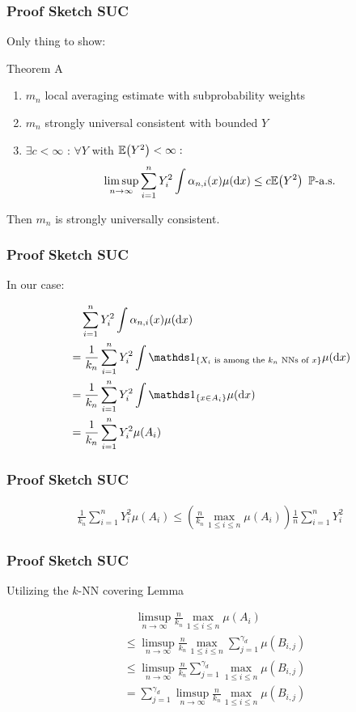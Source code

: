 \begin{frame}
\frametitle{Proof Sketch SUC}
Only thing to show:
\begin{block} {Theorem A}
\begin{enumerate} [label=(\roman*)]
    \item $m_n$ local averaging estimate with subprobability weights
    \item $m_n$ strongly universal consistent with bounded $Y$
    \item $\exists c < \infty $ : $\forall Y$ with $\mathbb{E}\!\left(Y^2\right)<\infty : $
\[\limsup_{n \to \infty} \sum_{i=1}^{n}Y_i^2 \int \alpha_{n,i}(x) \mu(\diff{x}) \leq c\ev{Y^2} \ \text{\(\mathbb{P}\)-a.s.}\]
\end{enumerate}
Then $m_n$ is strongly universally consistent.
\end{block}
\end{frame}

\begin{frame}
\frametitle{Proof Sketch SUC}
In our case:
\begin{block} {}
\begin{align*}
    &\quad \sum_{i=1}^{n}Y_i^2 \int \alpha_{n,i}(x) \mu(\diff{x}) \\
    &= \frac{1}{k_n} \sum_{i=1}^{n}Y_i^2 \int \ind{\{\text{\(X_i\) is among the \(k_n\) NNs of \(x\)}\}} \mu(\diff{x}) \\
    &= \frac{1}{k_n} \sum_{i=1}^{n}Y_i^2 \int \ind{\{x \in A_i\}} \mu(\diff{x}) \\
    &= \frac{1}{k_n} \sum_{i=1}^{n}Y_i^2 \mu(A_i) \\
\end{align*}
\end{block}
\end{frame}

\begin{frame}
\frametitle{Proof Sketch SUC}
\begin{block} {}
\begin{align*}
    \frac{1}{k_n} \sum_{i=1}^{n}Y_i^2 \mu(A_i)
    \leq \left(\frac{n}{k_n} \max_{1 \leq i \leq n} \mu(A_i) \right) \frac{1}{n}\sum_{i=1}^{n}Y_i^2
\end{align*}
\end{block}
\end{frame}

\begin{frame}
\frametitle{Proof Sketch SUC}
Utilizing the \(k\)-NN covering Lemma
\begin{block} {}
\begin{align*}
        &\quad \limsup_{n \to \infty} \frac{n}{k_n} \max_{1 \leq i \leq n} \mu(A_i) \\
        &\leq \limsup_{n \to \infty} \frac{n}{k_n} \max_{1 \leq i \leq n} \sum_{j=1}^{\gamma_d} \mu(B_{i, j}) \\
        &\leq \limsup_{n \to \infty} \frac{n}{k_n} \sum_{j=1}^{\gamma_d} \max_{1 \leq i \leq n} \mu(B_{i, j}) \\
        &= \sum_{j=1}^{\gamma_d} \limsup_{n \to \infty} \frac{n}{k_n}  \max_{1 \leq i \leq n} \mu(B_{i, j}) \\
\end{align*}
\end{block}
\end{frame}

